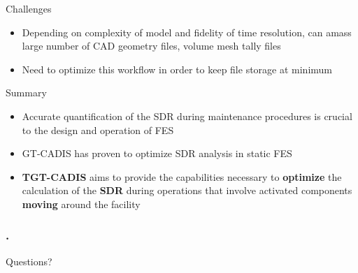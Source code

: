 \documentclass{beamer}
\begin{document}
\begin{frame}{Challenges}
			\begin{itemize}
				\item{Depending on complexity of model and
					fidelity of time resolution, can amass
					large number of CAD geometry files,
					volume mesh tally files}
				\item{Need to optimize this workflow in order
					to keep file storage at minimum}
			\end{itemize}
\end{frame}
\begin{frame}{Summary}
	\begin{itemize}
		\item{Accurate quantification of the SDR during maintenance
			procedures is crucial to the design and operation of
			FES}
		\item{GT-CADIS has proven to optimize SDR analysis in
			static FES}
\vspace{0.5cm}
		\item{\textbf{TGT-CADIS} aims to provide the capabilities necessary to
			\textbf{optimize} the calculation of the \textbf{SDR}
			during operations that involve activated components
			\textbf{moving} around the facility}
	\end{itemize}
\end{frame}

\begin{frame}[c]
	\frametitle{\tiny{.}}
	\begin{center}
	{\Huge Questions?}
	\end{center}
\end{frame}



\end{document}
